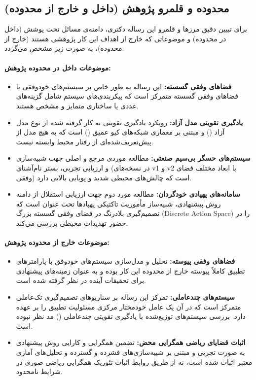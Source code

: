 \documentclass[oneside,openany,phd]{TMU-Thesis}
\begin{document}
\subsection*{محدوده و قلمرو پژوهش (داخل و خارج از محدوده)}

برای تبیین دقیق مرزها و قلمرو این رساله دکتری، دامنه‌ی مسائل تحت پوشش (داخل در محدوده) و موضوعاتی که خارج از اهداف این کار پژوهشی هستند (خارج از محدوده)، به صورت زیر مشخص می‌گردد:

\paragraph{موضوعات داخل در محدوده پژوهش:}
\begin{itemize}
    \item \textbf{فضاهای وفقی گسسته:} این رساله به طور خاص بر سیستم‌های خودوفقی با فضاهای وفقی گسسته متمرکز است که پیکربندی‌های سیستم شامل گزینه‌های عددی یا ساختاری متمایز و مشخص هستند.
    \item \textbf{یادگیری تقویتی مدل‌ آزاد:} رویکرد یادگیری تقویتی به کار گرفته شده از نوع مدل‌ آزاد () و مبتنی بر معماری شبکه‌های کیو عمیق () است که به هیچ مدل از پیش‌تعریف‌شده‌ای از رفتار محیط وابسته نیست.
    \item \textbf{سیستم‌های حسگر بی‌سیم صنعتی:} مطالعه موردی مرجع و اصلی جهت شبیه‌سازی و ارزیابی تجربی، بستر نام‌آشنای  \cite{gerostathopoulos2019deltaiot} (در نسخه‌های v1 و v2 با ابعاد مختلف فضای وفقی) است که چالش‌های محیطی شدید و پویایی بالایی دارد.
    \item \textbf{سامانه‌های پهپادی خودگردان:} مطالعه مورد دوم جهت ارزیابی استقلال از دامنه روش پیشنهادی، شبیه‌ساز مأموریت تاکتیکی پهپادها تحت عنوان  است که تصمیم‌گیری بلادرنگ در فضای وفقی گسسته بزرگ (Discrete Action Space) را در حضور تهدیدات محیطی بررسی می‌کند.
\end{itemize}

\paragraph{موضوعات خارج از محدوده پژوهش:}
\begin{itemize}
    \item \textbf{فضاهای وفقی پیوسته:} تحلیل و مدل‌سازی سیستم‌های خودوفق با پارامترهای تطبیق کاملاً پیوسته خارج از محدوده این کار بوده و به عنوان زمینه‌های پیشنهادی برای تحقیقات آینده در نظر گرفته شده است.
    \item \textbf{سیستم‌های چندعاملی:} تمرکز این رساله بر سناریوهای تصمیم‌گیری تک‌عاملی متمرکز است که در آن یک عامل خودمختار مرکزی مسئولیت تطبیق را بر عهده دارد. بررسی سیستم‌های توزیع‌شده با یادگیری تقویتی چندعاملی () مد نظر نبوده است.
    \item \textbf{اثبات قضایای ریاضی همگرایی محض:} تضمین همگرایی و کارایی روش پیشنهادی به صورت تجربی و مبتنی بر شبیه‌سازی‌های فشرده و گسترده و تحلیل‌های آماری معتبر اثبات شده است، نه از طریق روابط اثبات تئوریک همگرایی ریاضی صوری در شرایط نامحدود.
\end{itemize}
\end{document}

